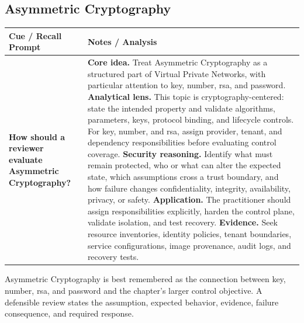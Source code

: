 \documentclass[11pt]{article}
\newcommand{\CornellHeader}{%
\rowcolor{Navy}\color{white}\bfseries Cue / Recall Prompt & \color{white}\bfseries Notes / Analysis\\\hline}
\newcommand{\CornellRow}[2]{%
\cellcolor{CueGray}\RaggedRight\textbf{#1} & \RaggedRight #2\\\hline}
\begin{document}
\subsection*{Asymmetric Cryptography}
\begin{longtable}{>{\RaggedRight\arraybackslash}p{}|>{\RaggedRight\arraybackslash}p{}}
\CornellHeader
\CornellRow{How should a reviewer evaluate Asymmetric Cryptography?}{\textbf{Core idea.} Treat Asymmetric Cryptography as a structured part of Virtual Private Networks, with particular attention to key, number, rsa, and password. \textbf{Analytical lens.} This topic is cryptography-centered: state the intended property and validate algorithms, parameters, keys, protocol binding, and lifecycle controls. For key, number, and rsa, assign provider, tenant, and dependency responsibilities before evaluating control coverage. \textbf{Security reasoning.} Identify what must remain protected, who or what can alter the expected state, which assumptions cross a trust boundary, and how failure changes confidentiality, integrity, availability, privacy, or safety. \textbf{Application.} The practitioner should assign responsibilities explicitly, harden the control plane, validate isolation, and test recovery. \textbf{Evidence.} Seek resource inventories, identity policies, tenant boundaries, service configurations, image provenance, audit logs, and recovery tests.}
\end{longtable}
\begin{topicsummary}
Asymmetric Cryptography is best remembered as the connection between key, number, rsa, and password and the chapter's larger control objective. A defensible review states the assumption, expected behavior, evidence, failure consequence, and required response.
\end{topicsummary}
\end{document}
